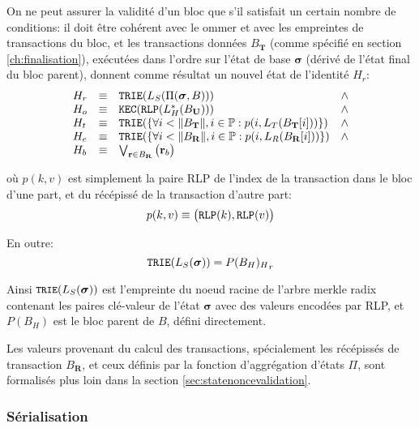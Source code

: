 \documentclass[9pt,oneside]{amsart}
\begin{document}
\begin{multicols}{2}
On ne peut assurer la validité d'un bloc que s'il satisfait un certain nombre de conditions: il doit être cohérent avec le ommer et avec les empreintes de transactions du bloc, et les transactions données $B_\mathbf{T}$ (comme spécifié en section \ref{ch:finalisation}), exécutées dans l'ordre sur l'état de base $\boldsymbol{\sigma}$ (dérivé de l'état final du bloc parent), donnent comme résultat un nouvel état de l'identité $H_r$:
\begin{equation}
\begin{array}[t]{lclc}
H_r &\equiv& \mathtt{\small TRIE}(L_S(\Pi(\boldsymbol{\sigma}, B))) & \wedge \\
H_o &\equiv& \mathtt{\small KEC}(\mathtt{\small RLP}(L_H^*(B_\mathbf{U}))) & \wedge \\
H_t &\equiv& \mathtt{\small TRIE}(\{\forall i < \lVert B_\mathbf{T} \rVert, i \in \mathbb{P}: p(i, L_T(B_\mathbf{T}[i]))\}) & \wedge \\
H_e &\equiv& \mathtt{\small TRIE}(\{\forall i < \lVert B_\mathbf{R} \rVert, i \in \mathbb{P}: p(i, L_R(B_\mathbf{R}[i]))\}) & \wedge \\
H_b &\equiv& \bigvee_{\mathbf{r} \in B_\mathbf{R}} \big( \mathbf{r}_b \big)
\end{array}
\end{equation}

où $p(k, v)$ est simplement la paire RLP de l'index de la transaction dans le bloc d'une part, et du récépissé de la transaction d'autre part:
\begin{equation}
p(k, v) \equiv \big( \mathtt{\small RLP}(k), \mathtt{\small RLP}(v) \big)
\end{equation}

En outre:
\begin{equation}
\mathtt{\small TRIE}(L_S(\boldsymbol{\sigma})) = {P(B_H)_H}_r
\end{equation}

Ainsi $\texttt{\small TRIE}(L_S(\boldsymbol{\sigma}))$ est l'empreinte du noeud racine de l'arbre merkle radix contenant les paires clé-valeur de l'état $\boldsymbol{\sigma}$ avec des valeurs encodées par RLP, et $P(B_H)$ est le bloc parent de $B$, défini directement.

Les valeurs provenant du calcul des transactions, spécialement les récépissés de transaction $B_\mathbf{R}$, et ceux définis par la fonction d'aggrégation d'états $\Pi$, sont formalisés plus loin dans la section \ref{sec:statenoncevalidation}.

\subsubsection{Sérialisation}


\end{multicols}
\end{document}
